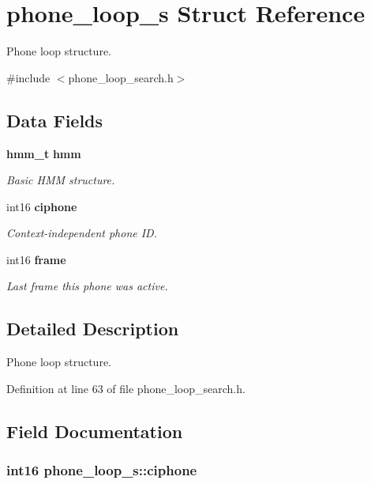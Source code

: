\section{phone\-\_\-loop\-\_\-s Struct Reference}
\label{structphone__loop__s}


Phone loop structure.  




{\ttfamily \#include $<$phone\-\_\-loop\-\_\-search.\-h$>$}

\subsection*{Data Fields}
\begin{DoxyCompactItemize}
\item 
{\bf hmm\-\_\-t} {\bf hmm}
\begin{DoxyCompactList}\small\item\em Basic H\-M\-M structure. \end{DoxyCompactList}\item 
int16 {\bf ciphone}
\begin{DoxyCompactList}\small\item\em Context-\/independent phone I\-D. \end{DoxyCompactList}\item 
int16 {\bf frame}
\begin{DoxyCompactList}\small\item\em Last frame this phone was active. \end{DoxyCompactList}\end{DoxyCompactItemize}


\subsection{Detailed Description}
Phone loop structure. 

Definition at line 63 of file phone\-\_\-loop\-\_\-search.\-h.



\subsection{Field Documentation}
\subsubsection[{ciphone}]{\setlength{\rightskip}{0pt plus 5cm}int16 phone\-\_\-loop\-\_\-s\-::ciphone}\label{structphone__loop__s_a471523bb294d53b6c17799dfb5946e59}


